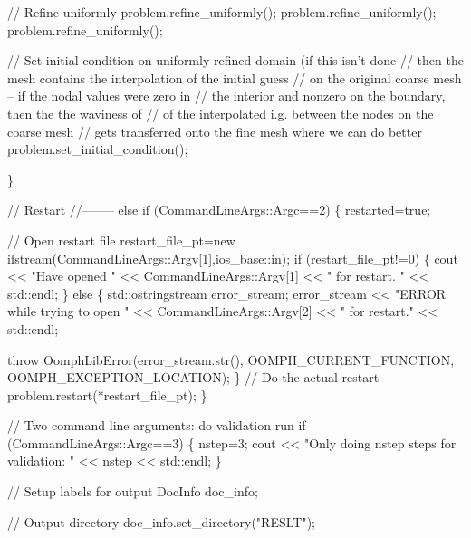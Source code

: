 \begin{DoxyCodeInclude}
{{{{{{{   \textcolor{comment}{// Refine uniformly}
   problem.refine\_uniformly();
   problem.refine\_uniformly();
   problem.refine\_uniformly();

   \textcolor{comment}{// Set initial condition on uniformly refined domain (if this isn't done}
   \textcolor{comment}{// then the mesh contains the interpolation of the initial guess}
   \textcolor{comment}{// on the original coarse mesh -- if the nodal values were zero in}
   \textcolor{comment}{// the interior and nonzero on the boundary, then the the waviness of}
   \textcolor{comment}{// of the interpolated i.g. between the nodes on the coarse mesh}
   \textcolor{comment}{// gets transferred onto the fine mesh where we can do better}
   problem.set\_initial\_condition();

  \}
 
 \textcolor{comment}{// Restart}
 \textcolor{comment}{//--------}
 \textcolor{keywordflow}{else} \textcolor{keywordflow}{if} (CommandLineArgs::Argc==2)
  \{
   restarted=\textcolor{keyword}{true};

   \textcolor{comment}{// Open restart file}
   restart\_file\_pt=\textcolor{keyword}{new} ifstream(CommandLineArgs::Argv[1],ios\_base::in);
   \textcolor{keywordflow}{if} (restart\_file\_pt!=0)
    \{
     cout << \textcolor{stringliteral}{"Have opened "} << CommandLineArgs::Argv[1] << 
      \textcolor{stringliteral}{" for restart. "} << std::endl;
    \}
   \textcolor{keywordflow}{else}
    \{
     std::ostringstream error\_stream;
     error\_stream << \textcolor{stringliteral}{"ERROR while trying to open "} 
                  << CommandLineArgs::Argv[2] 
                  << \textcolor{stringliteral}{" for restart."} << std::endl;

     \textcolor{keywordflow}{throw} OomphLibError(error\_stream.str(),
                         OOMPH\_CURRENT\_FUNCTION,
                         OOMPH\_EXCEPTION\_LOCATION);
    \}
   \textcolor{comment}{// Do the actual restart}
   problem.restart(*restart\_file\_pt);
  \}


 \textcolor{comment}{// Two command line arguments: do validation run}
 \textcolor{keywordflow}{if} (CommandLineArgs::Argc==3)
  \{
    nstep=3;
    cout << \textcolor{stringliteral}{"Only doing nstep steps for validation: "} << nstep << std::endl;
  \}




 \textcolor{comment}{// Setup labels for output}
 DocInfo doc\_info;
 
 \textcolor{comment}{// Output directory}
 doc\_info.set\_directory(\textcolor{stringliteral}{"RESLT"}); 


}}}}}}}
\end{DoxyCodeInclude}
